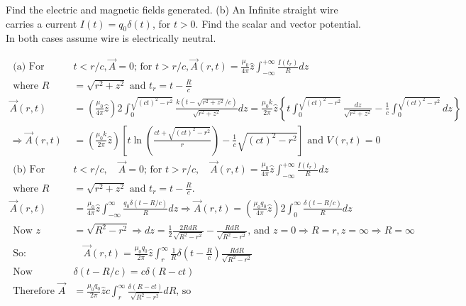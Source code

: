 \begin{enumerate}
	Find the electric and magnetic fields generated.
	(b) An Infinite straight wire carries a current $I(t)=q_{0} \delta(t)$, for $t>0$.
	Find the scalar and vector potential. In both cases assume wire is electrically neutral.
	\begin{answer}
		\begin{align*}
		\text { (a) For }& t<r / c, \vec{A}=0 \text {; for } t>r / c, \vec{A}(r, t)=\frac{\mu_{0}}{4 \pi} \hat{z} \int_{-\infty}^{+\infty} \frac{I\left(t_{r}\right)}{R} d z\\
		\text { where } R&=\sqrt{r^{2}+z^{2}} \text { and } t_{r}=t-\frac{R}{c}\\
		\vec{A}(r, t)&=\left(\frac{\mu_{0}}{4 \pi} \hat{z}\right) 2 \int_{0}^{\sqrt{(c t)^{2}-r^{2}}} \frac{k\left(t-\sqrt{r^{2}+z^{2}} / c\right)}{\sqrt{r^{2}+z^{2}}} d z=\frac{\mu_{0} k}{2 \pi} \hat{z}\left\{t \int_{0}^{\sqrt{(c t)^{2}-r^{2}}} \frac{d z}{\sqrt{r^{2}+z^{2}}}-\frac{1}{c} \int_{0}^{\sqrt{(c t)^{2}-r^{2}}} d z\right\}\\
		\Rightarrow \vec{A}(r, t)&=\left(\frac{\mu_{0} k}{2 \pi} \hat{z}\right)\left[t \ln \left(\frac{c t+\sqrt{(c t)^{2}-r^{2}}}{r}\right)-\frac{1}{c} \sqrt{(c t)^{2}-r^{2}}\right] \text { and } V(r, t)=0\\
		\text { (b) For } &t<r / c, \quad \vec{A}=0 \text {; for } t>r / c, \quad \vec{A}(r, t)=\frac{\mu_{0}}{4 \pi} \hat{z} \int_{-\infty}^{+\infty} \frac{I\left(t_{r}\right)}{R} d z\\
		\text { where } R&=\sqrt{r^{2}+z^{2}} \text { and } t_{r}=t-\frac{R}{c} \text {. }\\
		\vec{A}(r, t)&=\frac{\mu_{0}}{4 \pi} \hat{z} \int_{-\infty}^{\infty} \frac{q_{0} \delta(t-R / c)}{R} d z \Rightarrow \vec{A}(r, t)=\left(\frac{\mu_{0} q_{0}}{4 \pi} \hat{z}\right) 2 \int_{0}^{\infty} \frac{\delta(t-R / c)}{R} d z\\
		\text { Now } z&=\sqrt{R^{2}-r^{2}} \Rightarrow d z=\frac{1}{2} \frac{2 R d R}{\sqrt{R^{2}-r^{2}}}-\frac{R d R}{\sqrt{R^{2}-r^{2}}} \text {, and } z=0 \Rightarrow R=r, z=\infty \Rightarrow R=\infty\\
		\text { So: } &\quad \vec{A}(r, t)=\frac{\mu_{0} q_{0}}{2 \pi} \hat{z} \int_{r}^{\infty} \frac{1}{R} \delta\left(t-\frac{R}{c}\right) \frac{R d R}{\sqrt{R^{2}-r^{2}}}\\
		\text { Now }& \delta(t-R / c)=c \delta(R-c t)\\
		\text { Therefore } \vec{A}&=\frac{\mu_{0} q_{0}}{2 \pi} \hat{z} c \int_{r}^{\infty} \frac{\delta(R-c t)}{\sqrt{R^{2}-r^{2}}} d R \text {, so }\\

\end{align*}
\end{answer}
\end{enumerate}
